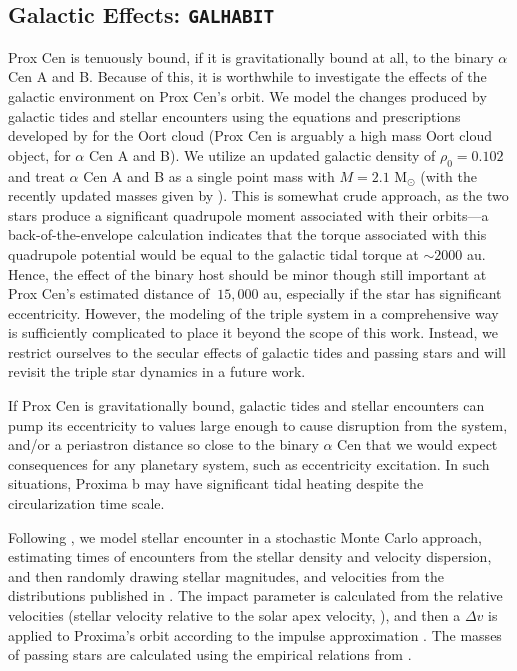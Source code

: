 \documentclass[preprint,12pt]{aastex}
\def\galhabit{\texttt{\footnotesize{GALHABIT}}\xspace}
\begin{document}
\subsection{Galactic Effects: \galhabit}
\label{sec:models:galhabit}
Prox Cen is tenuously bound, if it is gravitationally bound at all, to
the binary $\alpha$ Cen A and B. Because of this, it is worthwhile to
investigate the effects of the galactic environment on Prox Cen's
orbit. We model the changes produced by galactic tides and stellar
encounters using the equations and prescriptions developed by
\cite{Heisler1986, Heisler1987, Rickman2008} for the Oort cloud (Prox
Cen is arguably a high mass Oort cloud object, for $\alpha$ Cen A and
B).  We utilize an updated galactic density of $\rho_0 = 0.102$
\citep{Holmberg2000} and treat $\alpha$ Cen A and B as a single point
mass with $M = 2.1$ M$_{\odot}$ (with the recently updated masses
given by \cite{PourbaixBoffin16}). This is somewhat crude approach, as
the two stars produce a significant quadrupole moment associated with
their orbits---a back-of-the-envelope calculation indicates that the
torque associated with this quadrupole potential would be equal to the
galactic tidal torque at $\sim 2000$ au. Hence, the effect of the
binary host should be minor though still important at Prox Cen's
estimated distance of $~15,000$ au, especially if the star has
significant eccentricity. However, the modeling of the triple system
in a comprehensive way is sufficiently complicated \citep[see,
  i.e.][]{Harrington1968, Ford2000} to place it beyond the scope of
this work.  Instead, we restrict ourselves to the secular effects of
galactic tides and passing stars and will revisit the triple star
dynamics in a future work.

If Prox Cen is gravitationally bound, galactic tides and stellar
encounters can pump its eccentricity to values large enough to cause
disruption from the system, and/or a periastron distance so close to
the binary $\alpha$ Cen that we would expect consequences for any
planetary system, such as eccentricity excitation.  In such
situations, Proxima b may have significant tidal heating despite the
circularization time scale.

Following \cite{Heisler1987,Rickman2008}, we model stellar encounter
in a stochastic Monte Carlo approach, estimating times of encounters
from the stellar density and velocity dispersion, and then randomly
drawing stellar magnitudes, and velocities from the distributions
published in \cite{Garciasanchez2001}. The impact parameter is
calculated from the relative velocities (stellar velocity relative to
the solar apex velocity, \cite[see][]{Rickman2008}), and then a
$\Delta v$ is applied to Proxima's orbit according to the impulse
approximation \citep{Remy1985}. The masses of passing stars are
calculated using the empirical relations from \cite{Reid2002}.
\end{document}
